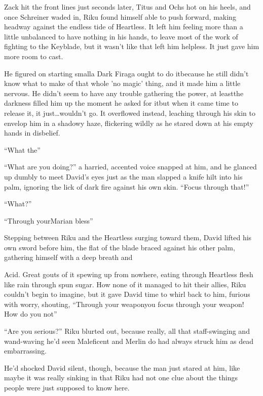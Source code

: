 Zack hit the front lines just seconds later, Titus and Ochs hot on his heels, and once Schreiner waded in, Riku found himself able to push forward, making headway against the endless tide of Heartless. It left him feeling more than a little unbalanced to have nothing in his hands, to leave most of the work of fighting to the Keyblade, but it wasn't like that left him helpless. It just gave him more room to cast.

He figured on starting small\textemdash a Dark Firaga ought to do it\textemdash because he still didn't know what to make of that whole 'no magic' thing, and it made him a little nervous. He didn't seem to have any trouble gathering the power, at least\textemdash the darkness filled him up the moment he asked for it\textemdash but when it came time to release it, it just\ldots wouldn't go. It overflowed instead, leaching through his skin to envelop him in a shadowy haze, flickering wildly as he stared down at his empty hands in disbelief.

``What the\textemdash ''

``What are you doing?'' a harried, accented voice snapped at him, and he glanced up dumbly to meet David's eyes just as the man slapped a knife hilt into his palm, ignoring the lick of dark fire against his own skin. ``Focus through that!''

``What?''

``Through your\textemdash Marian bless\textemdash ''

Stepping between Riku and the Heartless surging toward them, David lifted his own sword before him, the flat of the blade braced against his other palm, gathering himself with a deep breath and\textemdash 

Acid. Great gouts of it spewing up from nowhere, eating through Heartless flesh like rain through spun sugar. How none of it managed to hit their allies, Riku couldn't begin to imagine, but it gave David time to whirl back to him, furious with worry, shouting, ``Through your weapon\textemdash you focus through your weapon! How do you not\textemdash ''

``Are you serious?'' Riku blurted out, because really, all that staff-swinging and wand-waving he'd seen Maleficent and Merlin do had always struck him as dead embarrassing.

He'd shocked David silent, though, because the man just stared at him, like maybe it was really sinking in that Riku had not one clue about the things people were just supposed to know here.

